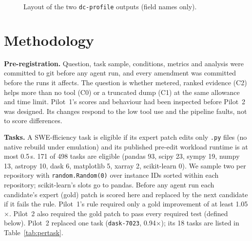 \documentclass[conference]{IEEEtran}
\newcommand{\tool}{\texttt{dc-profile}}
\begin{document}
\begin{figure}[t]
\centering
\footnotesize
{}
\caption{Layout of the two \tool{} outputs (field names only).}
\label{fig:formats}
\end{figure}

\section{Methodology}
\label{sec:method}

\textbf{Pre-registration.} Question, task sample, conditions, metrics and
analysis were committed to git before any agent run, and every amendment was
committed before the runs it affects. The question is whether metered, ranked
evidence (C2) helps more than no tool (C0) or a truncated dump (C1) at the
same allowance and time limit. Pilot~1's scores and behaviour had been
inspected before Pilot~2 was designed. Its changes respond to the low tool
use and the pipeline faults, not to score differences.

\textbf{Tasks.} A SWE-fficiency task is eligible if its expert patch edits only
\texttt{.py} files (no native rebuild under emulation) and its published
pre-edit workload runtime is at most 0.5\,s. 171 of 498 tasks are eligible
(pandas 93, scipy 23, sympy 19, numpy 13, astropy 10, dask 6, matplotlib 5,
xarray 2, scikit-learn 0). We sample two per repository with
\texttt{random.Random(0)} over instance IDs sorted within each repository;
scikit-learn's slots go to pandas. Before any agent run each candidate's
expert (gold) patch is scored here and replaced by the next candidate if it
fails the rule. Pilot~1's rule required only a gold improvement of at least
1.05$\times$. Pilot~2 also required the gold patch to pass every required test
(defined below). Pilot~2 replaced one task (\texttt{dask-7023}, 0.94$\times$);
its 18 tasks are listed in Table~\ref{tab:pertask}.
\end{document}

